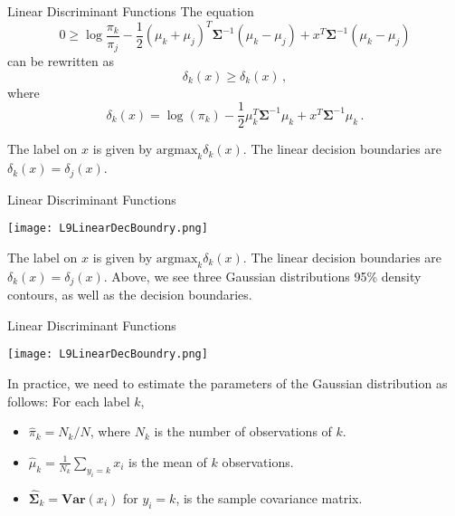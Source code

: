 \documentclass[10pt, table, dvipsnames,xcdraw, handout]{beamer}
\begin{document}
\begin{frame}[fragile]{Linear Discriminant Functions}
The equation
$$
0 \geq  \log \frac{\pi_k}{\pi_j} - \frac12(\mu_k+\mu_j)^T\mathbf{\Sigma}^{-1}(\mu_k-\mu_j)  + x^T\mathbf{\Sigma}^{-1}(\mu_k-\mu_j) 
$$\pause
can be rewritten as 
$$
\delta_k(x) \geq \delta_k(x)\,,
$$\pause
where
$$
\delta_k(x) = 
\log (\pi_k) - \frac12\mu_k^T\mathbf{\Sigma}^{-1}\mu_k  + x^T\mathbf{\Sigma}^{-1}\mu_k \,.
$$\pause

The label on $x$ is given by $\text{argmax}_k \delta_k(x)$. The linear decision boundaries are $\delta_k(x) = \delta_j(x)$. 
\end{frame}




\begin{frame}[fragile]{Linear Discriminant Functions}
  \begin{minipage}[t][0.5\textheight][t]{\textwidth}
	\centering \texttt{[image: L9LinearDecBoundry.png]} 
  \end{minipage}
  \vfill
\begin{minipage}[t][0.5\textheight][t]{\textwidth}
The label on $x$ is given by $\text{argmax}_k \delta_k(x)$. The linear decision boundaries are $\delta_k(x) = \delta_j(x)$. \pause Above, we see three Gaussian distributions 95\% density contours, as well as the decision boundaries. 
\end{minipage}
\end{frame}




\begin{frame}[fragile]{Linear Discriminant Functions}
  \begin{minipage}[t][0.5\textheight][t]{\textwidth}
	\centering \texttt{[image: L9LinearDecBoundry.png]} 
  \end{minipage}
  \vfill
\begin{minipage}[t][0.5\textheight][t]{\textwidth}
In practice, we need to estimate the parameters of the Gaussian distribution as follows: For each label $k$,
\begin{itemize}
\item[] $\hat{\pi}_k = N_k/N$, where $N_k$ is the number of observations of $k$. \pause
\item[] $\hat\mu_k  = \frac{1}{N_k}\sum_{y_i = k} x_i$ is the mean of $k$ observations.\pause
\item[] $\hat{\mathbf{\Sigma}}_k = \textbf{Var}(x_i)$ for $y_i = k$, is the sample covariance matrix.
\end{itemize}
\end{minipage}
\end{frame}
\end{document}
